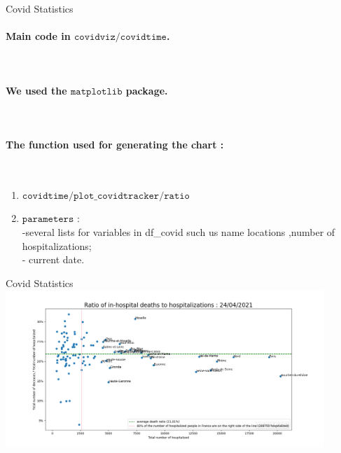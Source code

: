 \documentclass[11pt, compress, tikz, xcolor=table]{beamer}
\theoremstyle{definition}
\begin{document}
\begin{frame}[fragile]{Covid Statistics} 

\paragraph{Main code in $\texttt{covidviz/covidtime}$.}\\

\paragraph{We used the $\texttt{matplotlib}$ package.}\\

\paragraph{The function used for generating the chart :}\\
 \begin{enumerate}
    \item $\texttt{covidtime/plot\_covidtracker/ratio}$
    \item $\texttt{parameters :}$\\
       -several lists for variables in df\_covid such us name locations ,number of hospitalizations;\\
       - current date.\\
    
\end{enumerate}

\end{frame}

\begin{frame}[fragile]{Covid Statistics}
      \includegraphics[width=12cm]{images/covidtracker.png}
      
\end{frame}
\end{document}
